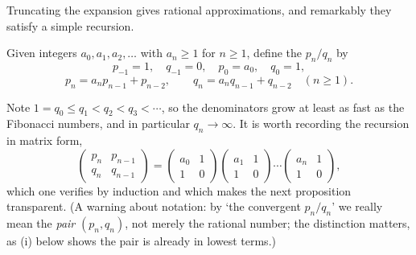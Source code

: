 Truncating the expansion gives rational approximations, and remarkably they satisfy a simple recursion.

\begin{definition}
	Given integers $a_0, a_1, a_2, \dots$ with $a_n \geq 1$ for $n \geq 1$, define the  $p_n/q_n$ by
	$$
	p_{-1} = 1, \quad q_{-1} = 0, \quad p_0 = a_0, \quad q_0 = 1,
	$$
	$$
	p_n = a_np_{n-1} + p_{n-2}, \qquad q_n = a_nq_{n-1} + q_{n-2} \quad (n \geq 1).
	$$
\end{definition}

Note $1 = q_0 \leq q_1 < q_2 < q_3 < \cdots$, so the denominators grow at least as fast as the Fibonacci numbers, and in particular $q_n \to \infty$. It is worth recording the recursion in matrix form,
$$
\begin{pmatrix} p_n & p_{n-1} \\ q_n & q_{n-1}\end{pmatrix} = \begin{pmatrix} a_0 & 1 \\ 1 & 0\end{pmatrix}\begin{pmatrix} a_1 & 1 \\ 1 & 0\end{pmatrix}\cdots\begin{pmatrix}a_n & 1 \\ 1 & 0\end{pmatrix},
$$
which one verifies by induction and which makes the next proposition transparent. (A warning about notation: by `the convergent $p_n/q_n$' we really mean the \emph{pair} $(p_n, q_n)$, not merely the rational number; the distinction matters, as (i) below shows the pair is already in lowest terms.)

